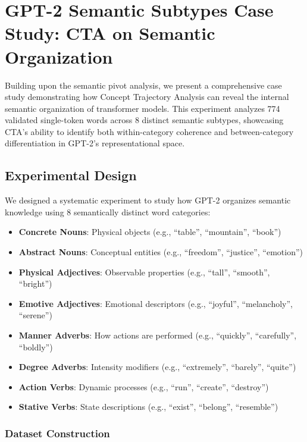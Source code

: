 \section{GPT-2 Semantic Subtypes Case Study: CTA on Semantic Organization}

Building upon the semantic pivot analysis, we present a comprehensive case study demonstrating how Concept Trajectory Analysis can reveal the internal semantic organization of transformer models. This experiment analyzes 774 validated single-token words across 8 distinct semantic subtypes, showcasing CTA's ability to identify both within-category coherence and between-category differentiation in GPT-2's representational space.

\subsection{Experimental Design}

We designed a systematic experiment to study how GPT-2 organizes semantic knowledge using 8 semantically distinct word categories:

\begin{itemize}
    \item \textbf{Concrete Nouns}: Physical objects (e.g., ``table'', ``mountain'', ``book'')
    \item \textbf{Abstract Nouns}: Conceptual entities (e.g., ``freedom'', ``justice'', ``emotion'')
    \item \textbf{Physical Adjectives}: Observable properties (e.g., ``tall'', ``smooth'', ``bright'')
    \item \textbf{Emotive Adjectives}: Emotional descriptors (e.g., ``joyful'', ``melancholy'', ``serene'')
    \item \textbf{Manner Adverbs}: How actions are performed (e.g., ``quickly'', ``carefully'', ``boldly'')
    \item \textbf{Degree Adverbs}: Intensity modifiers (e.g., ``extremely'', ``barely'', ``quite'')
    \item \textbf{Action Verbs}: Dynamic processes (e.g., ``run'', ``create'', ``destroy'')
    \item \textbf{Stative Verbs}: State descriptions (e.g., ``exist'', ``belong'', ``resemble'')
\end{itemize}

\subsubsection{Dataset Construction}

